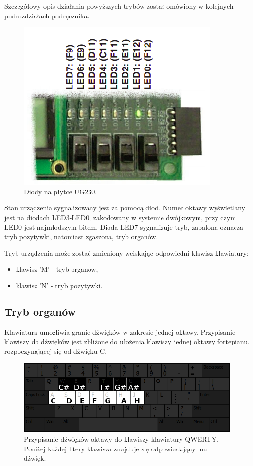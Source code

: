 \documentclass[a4paper,12pt]{article}
\begin{document}
Szczegółowy opis działania powyższych trybów został omówiony w kolejnych podrozdziałach podręcznika.


\begin{figure}[H]
  \centering
  \includegraphics[width=0.6\linewidth]{images/discrete_leds.png}
  \caption{Diody na płytce UG230\cite{web:ug230}.}
  \label{led_mapping}
\end{figure}

Stan urządzenia sygnalizowany jest za pomocą diod. Numer oktawy wyświetlany jest na diodach LED3-LED0, zakodowany w systemie dwójkowym, przy czym LED0 jest najmłodszym bitem. Dioda LED7 sygnalizuje tryb, zapalona oznacza tryb pozytywki, natomiast zgaszona, tryb organów. 

Tryb urządzenia może zostać zmieniony wciskając odpowiedni klawisz klawiatury:
\begin{itemize}
  \item klawisz 'M' - tryb organów,
  \item klawisz 'N' - tryb pozytywki.
\end{itemize}

\subsection{Tryb organów}

Klawiatura umożliwia granie dźwięków w zakresie jednej oktawy. 
Przypisanie klawiszy do dźwięków jest zbliżone do ułożenia klawiszy jednej oktawy fortepianu, rozpoczynającej się od dźwięku C.

\begin{figure}[H]
  \centering
  \includegraphics[width=\linewidth]{images/key_mapping.png}
  \caption{Przypisanie dźwięków oktawy do klawiszy klawiatury QWERTY. Poniżej każdej litery klawisza znajduje się odpowiadający mu dźwięk.}
  \label{key_mapping_user_manual}
\end{figure}
\end{document}
